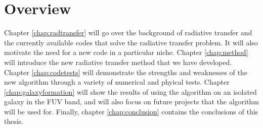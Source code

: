 


\section{Overview}

Chapter \ref{chap:radtransfer} will go over the background of radiative transfer and the currently available codes that solve the radiative transfer problem. It will also motivate the need for a new code in a particular niche. Chapter \ref{chap:method} will introduce the new radiative transfer method that we have developed. Chapter \ref{chap:codetests} will demonstrate the strengths and weaknesses of the new algorithm through a variety of numerical and phyical tests. Chapter \ref{chap:galaxyformation} will show the results of using the algorithm on an isolated galaxy in the FUV band, and will also focus on future projects that the algorithm will be used for. Finally, chapter \ref{chap:conclusion} contains the conclusions of this thesis.
